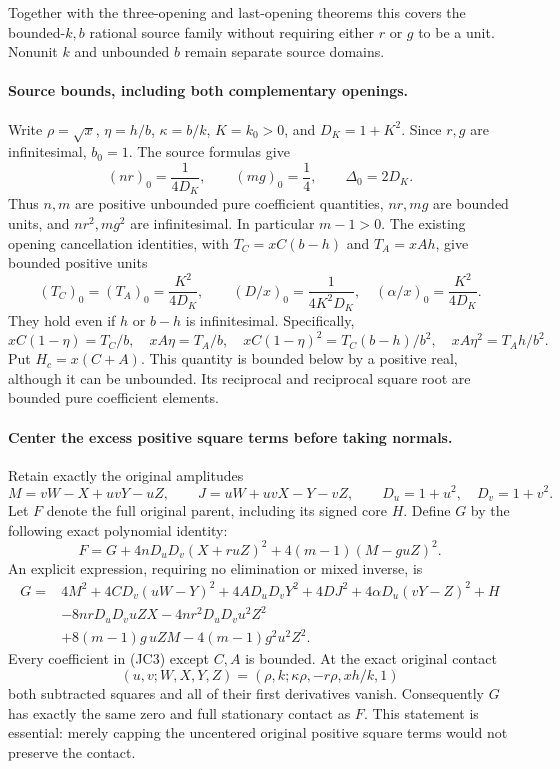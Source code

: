 Together with the three-opening and last-opening theorems this covers
the bounded-$k,b$ rational source family without requiring either $r$
or $g$ to be a unit. Nonunit $k$ and unbounded $b$ remain separate
source domains.

\paragraph{Source bounds, including both complementary openings.}
Write $\rho=\sqrt{x}$, $\eta=h/b$, $\kappa=b/k$, $K=k_0>0$,
and $D_K=1+K^2$.  Since $r,g$ are infinitesimal, $b_0=1$.
The source formulas give
\[
 (nr)_0=\frac1{4D_K},\qquad (mg)_0=\frac14,
 \qquad \Delta_0=2D_K.
\]
Thus $n,m$ are positive unbounded pure coefficient quantities,
$nr,mg$ are bounded units, and $nr^2,mg^2$ are infinitesimal.
In particular $m-1>0$.  The existing opening cancellation identities,
with $T_C=xC(b-h)$ and $T_A=xAh$, give bounded positive units
\[
 (T_C)_0=(T_A)_0=\frac{K^2}{4D_K},\qquad
 (D/x)_0=\frac1{4K^2D_K},\quad
 (\alpha/x)_0=\frac{K^2}{4D_K}.
\]
They hold even if $h$ or $b-h$ is infinitesimal.  Specifically,
\[
 xC(1-\eta)=T_C/b,\quad xA\eta=T_A/b,\quad
 xC(1-\eta)^2=T_C(b-h)/b^2,\quad
 xA\eta^2=T_Ah/b^2.                                  \tag{JC1}
\]
Put $H_c=x(C+A)$.  This quantity is bounded below by a positive
real, although it can be unbounded.  Its reciprocal and reciprocal
square root are bounded pure coefficient elements.

\paragraph{Center the excess positive square terms before taking normals.}
Retain exactly the original amplitudes
\[
 M=vW-X+uvY-uZ,\qquad J=uW+uvX-Y-vZ,
 \qquad D_u=1+u^2,\quad D_v=1+v^2.
\]
Let $F$ denote the full original parent, including its signed core
$H$.  Define $G$ by the following exact polynomial identity:
\[
 F=G+4nD_uD_v(X+ruZ)^2
             +4(m-1)(M-guZ)^2.                       \tag{JC2}
\]
An explicit expression, requiring no elimination or mixed inverse, is
\begin{align*}
G={}&4M^2+4CD_v(uW-Y)^2+4AD_uD_vY^2
       +4DJ^2+4\alpha D_u(vY-Z)^2+H\\
 &-8nrD_uD_vuZX-4nr^2D_uD_vu^2Z^2\\
 &+8(m-1)g\,uZM-4(m-1)g^2u^2Z^2.                  \tag{JC3}
\end{align*}
Every coefficient in (JC3) except $C,A$ is bounded.  At the exact
original contact
\[
 (u,v;W,X,Y,Z)=(\rho,k;\kappa\rho,-r\rho,xh/k,1)
\]
both subtracted squares and all of their first derivatives vanish.
Consequently $G$ has exactly the same zero and full stationary
contact as $F$.  This statement is essential: merely capping the
uncentered original positive square terms would not preserve the contact.

